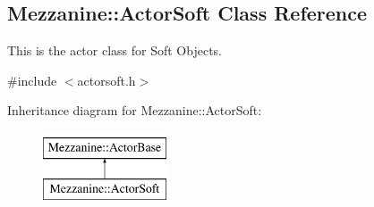 \hypertarget{classMezzanine_1_1ActorSoft}{
\subsection{Mezzanine::ActorSoft Class Reference}
\label{classMezzanine_1_1ActorSoft}
}


This is the actor class for Soft Objects.  




{\ttfamily \#include $<$actorsoft.h$>$}

Inheritance diagram for Mezzanine::ActorSoft:\begin{figure}[H]
\begin{center}
\leavevmode
\includegraphics[height=2.000000cm]{classMezzanine_1_1ActorSoft}
\end{center}
\end{figure}

